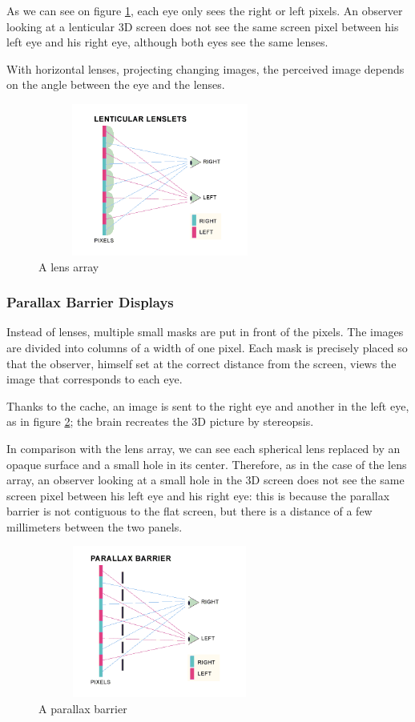 As we can see on figure \ref{fig:lenticular}, each eye only sees the right or left pixels. An observer looking at a lenticular 3D screen does not see the same screen pixel between his left eye and his right eye, although both eyes see the same lenses.

With horizontal lenses, projecting changing images, the perceived image depends on the angle between the eye and the lenses.

\begin{figure}[h!]
\centering
\includegraphics[width=8cm,height=5cm]{image/lentuc.png}
\caption{A lens array\cite{glasses-free3D}}

\label{fig:lenticular}
\end{figure}

\subsubsection{Parallax Barrier Displays}
Instead of lenses, multiple small masks are put in front of the pixels. The images are divided into columns of a width of one pixel.
Each mask is precisely placed so that the observer, himself set at the correct distance from the screen, views the image that corresponds to each eye. 

Thanks to the cache, an image is sent to the right eye and another in the left eye, as in figure \ref{fig:paraba}; the brain recreates the 3D picture by stereopsis.

In comparison with the lens array, we can see each spherical lens replaced by an opaque surface and a small hole in its center. Therefore, as in the case of the lens array, an observer looking at a small hole in the 3D screen does not see the same screen pixel between his left eye and his right eye: this is because the parallax barrier is not contiguous to the flat screen, but there is a distance of a few millimeters between the two panels.
\clearpage

\begin{figure}[h!]
\centering\includegraphics[width=8cm,height=5cm]{image/parallax.png}
\caption{A parallax barrier\cite{glasses-free3D}}
\label{fig:paraba}
\end{figure}

